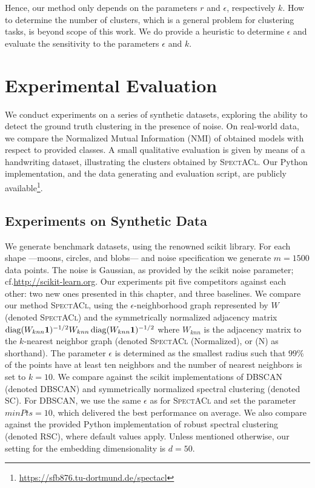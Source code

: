 Hence, our method only depends on the parameters $r$ and $\epsilon$, respectively $k$. How to determine the number of clusters, which is a general problem for clustering tasks, is beyond scope of this work. We do provide a heuristic to determine $\epsilon$ and evaluate the sensitivity to the parameters $\epsilon$ and $k$. 
\section{Experimental Evaluation}
We conduct experiments on a series of synthetic datasets, exploring the ability to detect the ground truth clustering in the presence of noise. On real-world data, we compare the Normalized Mutual Information (NMI) of obtained models with respect to provided classes. A small qualitative evaluation is given by means of a handwriting dataset, illustrating the clusters obtained by \textsc{SpectACl}. Our Python implementation, and the data generating and evaluation script, are publicly available\footnote{\url{https://sfb876.tu-dortmund.de/spectacl}}.
\subsection{Experiments on Synthetic Data}\label{sec:SA:synthExp}
We generate benchmark datasets, using the renowned scikit library. For each shape ---moons, circles, and blobs--- and noise specification we generate $m=1500$ data points. The noise is Gaussian, as provided by the scikit noise parameter; cf.\@ \url{http://scikit-learn.org}. Our experiments pit five competitors against each other: two new ones presented in this chapter, and three baselines.  
We compare our method \textsc{SpectACl}, using the $\epsilon$-neighborhood graph represented by $W$ (denoted \textsc{SpectACl}) and the symmetrically normalized adjacency matrix $\operatorname{diag}(W_{knn}\mathbf{1})^{-1/2}W_{knn}\operatorname{diag}(W_{knn}\mathbf{1})^{-1/2}$ where $W_{knn}$ is the adjacency matrix to the $k$-nearest neighbor graph (denoted \textsc{SpectACl} (Normalized), or (N) as shorthand). The parameter $\epsilon$ is determined as the smallest radius such that $99\%$ of the points have at least ten neighbors and the number of nearest neighbors is set to $k=10$. We compare against the scikit implementations of DBSCAN (denoted DBSCAN) and symmetrically normalized spectral clustering (denoted \textsc{SC}). For DBSCAN, we use the same $\epsilon$ as for \textsc{SpectACl} and set the parameter $minPts=10$, which delivered the best performance on average. We also compare against the provided Python implementation of robust spectral clustering~\citep{bojchevski2017robust} (denoted \textsc{RSC}), where default values apply. Unless mentioned otherwise, our setting for the embedding dimensionality is $d=50$.

